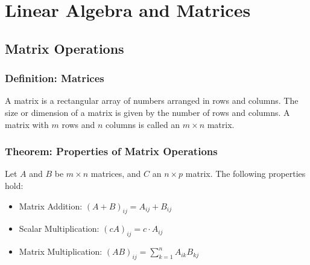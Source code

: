 \chapter{Linear Algebra and Matrices}

\section{Matrix Operations}

\subsection{Definition: Matrices}
\begin{defi}
A matrix is a rectangular array of numbers arranged in rows and columns. The size or dimension of a matrix is given by the number of rows and columns. A matrix with $m$ rows and $n$ columns is called an $m \times n$ matrix.
\end{defi}

\subsection{Theorem: Properties of Matrix Operations}
\begin{theorem}
Let $A$ and $B$ be $m \times n$ matrices, and $C$ an $n \times p$ matrix. The following properties hold:
\begin{itemize}
    \item Matrix Addition: $(A + B)_{ij} = A_{ij} + B_{ij}$
    \item Scalar Multiplication: $(cA)_{ij} = c \cdot A_{ij}$
    \item Matrix Multiplication: $(AB)_{ij} = \sum_{k=1}^{n} A_{ik}B_{kj}$
\end{itemize}
\end{theorem}

